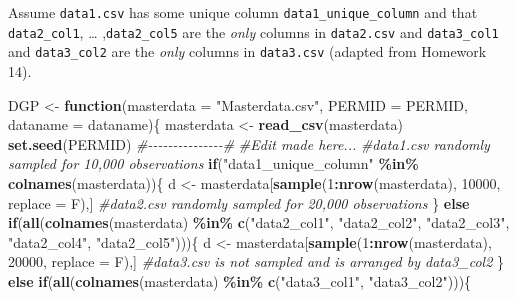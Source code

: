\documentclass[
  12pt,
]{book}
\newenvironment{Shaded}{\begin{snugshade}}{\end{snugshade}}
\newcommand{\AttributeTok}[1]{\textcolor[rgb]{0.13,0.29,0.53}{#1}}
\newcommand{\CommentTok}[1]{\textcolor[rgb]{0.56,0.35,0.01}{\textit{#1}}}
\newcommand{\ControlFlowTok}[1]{\textcolor[rgb]{0.13,0.29,0.53}{\textbf{#1}}}
\newcommand{\DecValTok}[1]{\textcolor[rgb]{0.00,0.00,0.81}{#1}}
\newcommand{\FunctionTok}[1]{\textcolor[rgb]{0.13,0.29,0.53}{\textbf{#1}}}
\newcommand{\NormalTok}[1]{#1}
\newcommand{\OtherTok}[1]{\textcolor[rgb]{0.56,0.35,0.01}{#1}}
\newcommand{\SpecialCharTok}[1]{\textcolor[rgb]{0.81,0.36,0.00}{\textbf{#1}}}
\newcommand{\StringTok}[1]{\textcolor[rgb]{0.31,0.60,0.02}{#1}}
\begin{document}
Assume \texttt{data1.csv} has some unique column \texttt{data1\_unique\_column} and that \texttt{data2\_col1}, \ldots{} ,\texttt{data2\_col5} are the \emph{only} columns in \texttt{data2.csv} and \texttt{data3\_col1} and \texttt{data3\_col2} are the \emph{only} columns in \texttt{data3.csv} (adapted from Homework 14).

\begin{Shaded}
\begin{Highlighting}[]
\NormalTok{DGP }\OtherTok{\textless{}{-}} \ControlFlowTok{function}\NormalTok{(}\AttributeTok{masterdata =} \StringTok{"Masterdata.csv"}\NormalTok{, }\AttributeTok{PERMID =}\NormalTok{ PERMID, }\AttributeTok{dataname =}\NormalTok{ dataname)\{}
\NormalTok{  masterdata }\OtherTok{\textless{}{-}} \FunctionTok{read\_csv}\NormalTok{(masterdata)}
  \FunctionTok{set.seed}\NormalTok{(PERMID)}
  \CommentTok{\#{-}{-}{-}{-}{-}{-}{-}{-}{-}{-}{-}{-}{-}{-}{-}\#}
  \CommentTok{\#Edit made here... }
  \CommentTok{\#\textasciigrave{}data1.csv\textasciigrave{} randomly sampled for 10,000 observations }
  \ControlFlowTok{if}\NormalTok{(}\StringTok{"data1\_unique\_column"} \SpecialCharTok{\%in\%} \FunctionTok{colnames}\NormalTok{(masterdata))\{}
\NormalTok{    d }\OtherTok{\textless{}{-}}\NormalTok{ masterdata[}\FunctionTok{sample}\NormalTok{(}\DecValTok{1}\SpecialCharTok{:}\FunctionTok{nrow}\NormalTok{(masterdata), }\DecValTok{10000}\NormalTok{, }\AttributeTok{replace =}\NormalTok{ F),]}
  \CommentTok{\#\textasciigrave{}data2.csv\textasciigrave{} randomly sampled for 20,000 observations }
\NormalTok{  \} }\ControlFlowTok{else} \ControlFlowTok{if}\NormalTok{(}\FunctionTok{all}\NormalTok{(}\FunctionTok{colnames}\NormalTok{(masterdata) }\SpecialCharTok{\%in\%} \FunctionTok{c}\NormalTok{(}\StringTok{"data2\_col1"}\NormalTok{, }\StringTok{"data2\_col2"}\NormalTok{, }
                                            \StringTok{"data2\_col3"}\NormalTok{, }\StringTok{"data2\_col4"}\NormalTok{, }\StringTok{"data2\_col5"}\NormalTok{)))\{ }
\NormalTok{    d }\OtherTok{\textless{}{-}}\NormalTok{ masterdata[}\FunctionTok{sample}\NormalTok{(}\DecValTok{1}\SpecialCharTok{:}\FunctionTok{nrow}\NormalTok{(masterdata), }\DecValTok{20000}\NormalTok{, }\AttributeTok{replace =}\NormalTok{ F),]}
  \CommentTok{\#\textasciigrave{}data3.csv\textasciigrave{} is not sampled and is arranged by \textasciigrave{}data3\_col2\textasciigrave{}}
\NormalTok{  \} }\ControlFlowTok{else} \ControlFlowTok{if}\NormalTok{(}\FunctionTok{all}\NormalTok{(}\FunctionTok{colnames}\NormalTok{(masterdata) }\SpecialCharTok{\%in\%} \FunctionTok{c}\NormalTok{(}\StringTok{"data3\_col1"}\NormalTok{, }\StringTok{"data3\_col2"}\NormalTok{)))\{}

\end{Highlighting}
\end{Shaded}
\end{document}

